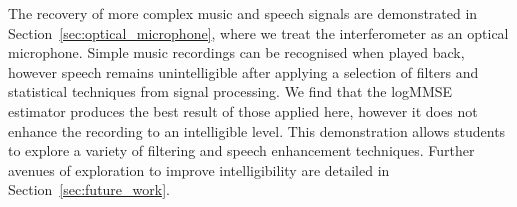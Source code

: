 \documentclass[paper-main.tex]{subfiles}
\begin{document}
The recovery of more complex music and speech signals are demonstrated in Section~\ref{sec:optical_microphone}, where we treat the interferometer as an optical microphone. 
Simple music recordings can be recognised when played back, however speech remains unintelligible after applying a selection of filters and statistical techniques from signal processing. 
We find that the logMMSE estimator produces the best result of those applied here, however it does not enhance the recording to an intelligible level. 
This demonstration allows students to explore a variety of filtering and speech enhancement techniques. 
Further avenues of exploration to improve intelligibility are detailed in Section~\ref{sec:future_work}. 
\end{document}
